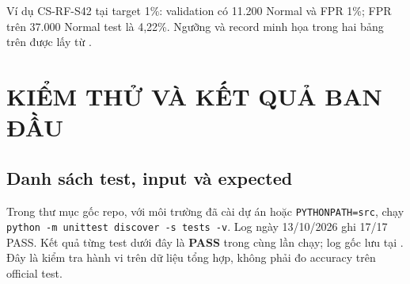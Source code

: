 \documentclass[12pt,a4paper,oneside]{report}
\begin{document}
Ví dụ CS-RF-S42 tại target 1\%: validation có 11.200 Normal và FPR 1\%; FPR trên 37.000 Normal test là 4,22\%. Ngưỡng và record minh họa trong hai bảng trên được lấy từ .

\chapter{KIỂM THỬ VÀ KẾT QUẢ BAN ĐẦU}
\section{Danh sách test, input và expected}\label{sec:tests}
Trong thư mục gốc repo, với môi trường đã cài dự án hoặc \texttt{PYTHONPATH=src}, chạy \texttt{python -m unittest discover -s tests -v}. Log ngày 13/10/2026 ghi 17/17 PASS. Kết quả từng test dưới đây là \textbf{PASS} trong cùng lần chạy; log gốc lưu tại . Đây là kiểm tra hành vi trên dữ liệu tổng hợp, không phải đo accuracy trên official test.
\begingroup{}\fontsize{9.5pt}{11pt}\selectfont\setlength{\tabcolsep}{3pt}\renewcommand{\arraystretch}{1.08}
\end{document}
